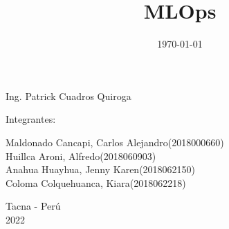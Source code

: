 \documentclass[twoside,twocolumn]{article}
\begin{document}
\begin{titlepage}
\begin{center}
\vspace*{0.1in}
\begin{large}
 Ing. Patrick Cuadros Quiroga\\
\end{large}

\vspace*{0.2in}
\vspace*{0.1in}
\begin{large}

Integrantes: \\
\begin{flushleft}
Maldonado Cancapi, Carlos Alejandro\hfill(2018000660) \\
Huillca Aroni, Alfredo\hfill(2018060903)\\
Anahua Huayhua, Jenny Karen\hfill(2018062150)\\
Coloma Colquehuanca, Kiara\hfill(2018062218)\\

\end{flushleft}
\end{large}

\vspace*{0.1in}
\begin{large}
Tacna - Perú\\
2022
\end{large}
\end{center}
\end{titlepage}

\setlength{\droptitle}{-4\baselineskip} %

\pretitle{\begin{center}\Huge\bfseries} %
\posttitle{\end{center}} %
\title{MLOps} %

\date{\today} %
\renewcommand{\maketitlehookd}{%

}




\maketitle

\end{document}
